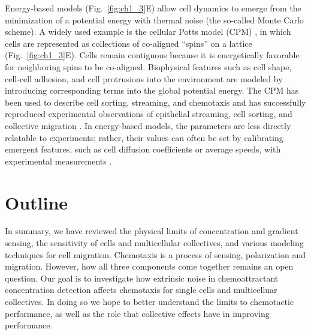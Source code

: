Energy-based models (Fig.\ \ref{fig:ch1_3}E) allow cell dynamics to emerge from the minimization of a potential energy with thermal noise (the so-called Monte Carlo scheme). A widely used example is the cellular Potts model (CPM) \cite{graner1992simulation, swat2012multi}, in which cells are represented as collections of co-aligned ``spins'' on a lattice (Fig.\ \ref{fig:ch1_3}E). Cells remain contiguous because it is energetically favorable for neighboring spins to be co-aligned. Biophysical features such as cell shape, cell-cell adhesion, and cell protrusions into the environment are modeled by introducing corresponding terms into the global potential energy.
The CPM has been used to describe cell sorting, streaming, and chemotaxis \cite{maree2007cellular} and has successfully reproduced experimental observations of epithelial streaming, cell sorting, and collective migration \cite{kabla2012collective,maree2007cellular,szabo2010collective}.
In energy-based models, the parameters are less directly relatable to experiments; rather, their values can often be set by calibrating emergent features, such as cell diffusion coefficients or average speeds, with experimental measurements \cite{szabo2010collective}.


\section{Outline}

In summary, we have reviewed the physical limits of concentration and gradient sensing, the sensitivity of cells and multicellular collectives, and various modeling techniques for cell migration. Chemotaxis is a process of sensing, polarization and migration. However, how all three components come together remains an open question. Our goal is to investigate how extrinsic noise in chemoattractant concentration detection affects chemotaxis for single cells and multicelluar collectives. In doing so we hope to better understand the limits to chemotactic performance, as well as the role that collective effects have in improving performance.

